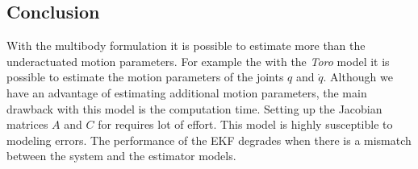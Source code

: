 \subsection{Conclusion}
 With the multibody formulation it is possible to estimate more than the underactuated motion parameters. For example the with the \emph{Toro} model it is possible to estimate the motion parameters of the joints $q$ and $\dot{q}$. Although we have an advantage of estimating additional motion parameters, the main drawback with this model is the computation time. Setting up the Jacobian matrices $A$ and $C$ for requires lot of effort. This model is highly susceptible to modeling errors. The performance of the EKF degrades when there is a mismatch between the system and the estimator models.